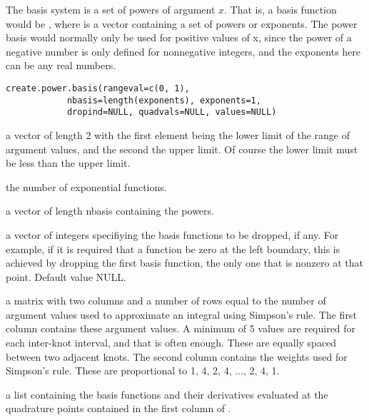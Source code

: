 \documentclass{article}
\begin{document}
\begin{Description}\relax
The basis system is a set of powers of argument $x$.  That is, a basis
function would be , where 
is a vector containing a set of powers or
exponents.  The power basis would normally only be used for positive
values of x, since the power of a negative number is only defined
for nonnegative integers, and the exponents here can be any real
numbers.
\end{Description}
\begin{Usage}
\begin{verbatim}
create.power.basis(rangeval=c(0, 1),
            nbasis=length(exponents), exponents=1,
            dropind=NULL, quadvals=NULL, values=NULL)
\end{verbatim}
\end{Usage}
\begin{Arguments}
\begin{ldescription}
\item[\code{rangeval}] a vector of length 2 with the first element being the lower limit of the
range of argument values, and the second the upper limit.  Of course the
lower limit must be less than the upper limit.

\item[\code{nbasis}] the number of exponential functions.

\item[\code{exponents}] a vector of length nbasis containing the powers.

\item[\code{dropind}] a vector of integers specifiying the basis functions to
be dropped, if any.  For example, if it is required that
a function be zero at the left boundary, this is achieved
by dropping the first basis function, the only one that
is nonzero at that point. Default value NULL.

\item[\code{quadvals}] a matrix with two columns and a number of rows equal to the number of
argument values used to approximate an integral using Simpson's rule.
The first column contains these argument values.
A minimum of 5 values are required for
each inter-knot interval, and that is often enough. These
are equally spaced between two adjacent knots.
The second column contains the weights used for Simpson's
rule.  These are proportional to 1, 4, 2, 4, ..., 2, 4, 1.

\item[\code{values}] a list containing the basis functions and their derivatives
evaluated at the quadrature points contained in the first
column of .

\end{ldescription}
\end{Arguments}
\end{document}
